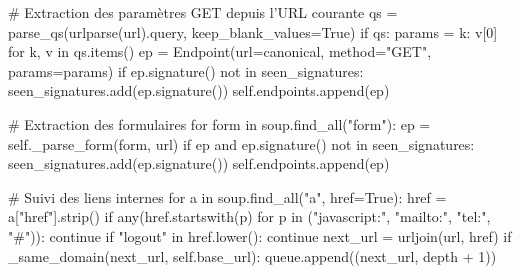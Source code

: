         # Extraction des paramètres GET depuis l'URL courante
        qs = parse_qs(urlparse(url).query, keep_blank_values=True)
        if qs:
            params = {k: v[0] for k, v in qs.items()}
            ep = Endpoint(url=canonical, method="GET", params=params)
            if ep.signature() not in seen_signatures:
                seen_signatures.add(ep.signature())
                self.endpoints.append(ep)

        # Extraction des formulaires
        for form in soup.find_all("form"):
            ep = self._parse_form(form, url)
            if ep and ep.signature() not in seen_signatures:
                seen_signatures.add(ep.signature())
                self.endpoints.append(ep)

        # Suivi des liens internes
        for a in soup.find_all("a", href=True):
            href = a["href"].strip()
            if any(href.startswith(p) for p in ("javascript:", "mailto:", "tel:", "#")):
                continue
            if "logout" in href.lower():
                continue
            next_url = urljoin(url, href)
            if _same_domain(next_url, self.base_url):
                queue.append((next_url, depth + 1))

